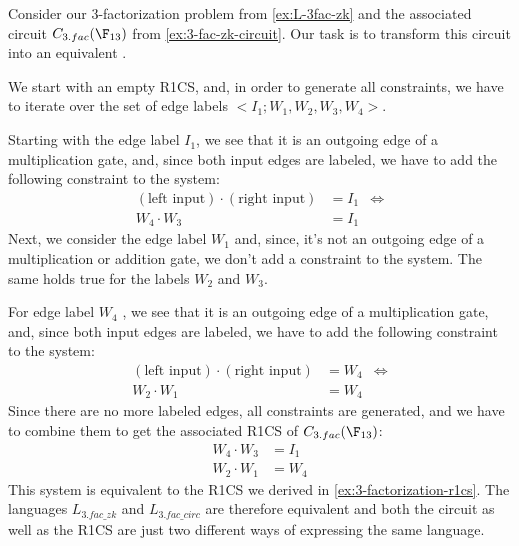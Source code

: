 \begin{example}[$3$-factorization] Consider our $3$-factorization problem from \examplename{} \ref{ex:L-3fac-zk} and the associated circuit $C_{3.fac}(\F_{13})$ from \examplename{} \ref{ex:3-fac-zk-circuit}. Our task is to transform this circuit into an equivalent .
\begin{center}
\end{center}
We start with an empty R1CS, and, in order to generate all constraints, we have to iterate over the set of edge labels $<I_1;W_1,W_2,W_3,W_4>$.  

Starting with the edge label $I_1$, we see that it is an outgoing edge of a multiplication gate, and, since both input edges are labeled, we  have to add the following constraint to the system:
\begin{align*}
(\text{left input})\cdot (\text{right input})  &= I_1 & \Leftrightarrow\\
W_4\cdot W_3  &= I_1
\end{align*}
Next, we consider the edge label $W_1$ and, since, it's not an outgoing edge of a multiplication or addition gate, we don't add a constraint to the system. The same holds true for the labels $W_2$ and $W_3$. 

For edge label $W_4$ , we see that it is an outgoing edge of a multiplication gate, and, since both input edges are labeled, we have to add the following constraint to the system:
\begin{align*}
(\text{left input})\cdot (\text{right input})  &= W_4 & \Leftrightarrow\\
W_2\cdot W_1  &= W_4
\end{align*} 
Since there are no more labeled edges, all constraints are generated, and we have to combine them to get the associated R1CS of $C_{3.fac}(\F_{13})$: 
\begin{align*}
 W_4\cdot W_3 & = I_1\\
 W_2\cdot W_1 & = W_4
\end{align*}
This system is equivalent to the R1CS we derived in \examplename{} \ref{ex:3-factorization-r1cs}. The languages $L_{3.fac\_zk}$ and $L_{3.fac\_circ}$ are therefore equivalent and both the circuit as well as the R1CS are just two different ways of expressing the same language.
\end{example}
